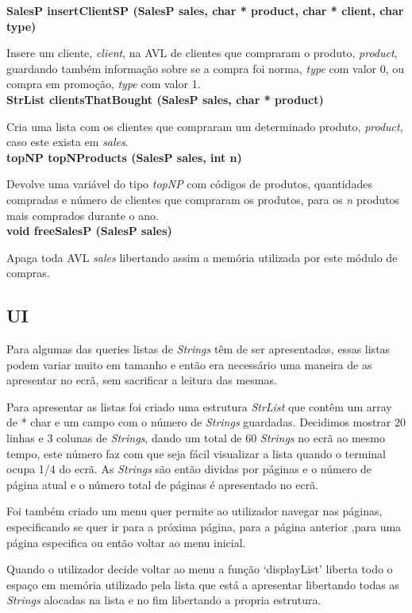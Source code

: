 \documentclass[12pt] {article}
\begin{document}
\noindent \textbf {SalesP insertClientSP (SalesP sales, char * product, char * client, char type)}
\par Insere um cliente, \emph{client}, na AVL de clientes que compraram o produto, \emph{product}, guardando 
também informação sobre se a compra foi norma, \emph{type} com valor 0, ou compra em promoção, 
\emph{type} com valor 1.\\

\noindent \textbf {StrList clientsThatBought (SalesP sales, char * product)}
\par Cria uma lista com os clientes que compraram um determinado produto, \emph{product}, caso este exista em
 \emph{sales}.\\
 
\noindent \textbf {topNP topNProducts (SalesP sales, int n)}
\par Devolve uma variável do tipo \emph{topNP} com códigos de produtos, quantidades compradas e número de 
clientes que compraram os produtos, para os \emph{n} produtos mais comprados durante o ano.\\

\noindent \textbf {void freeSalesP (SalesP sales)}
\par Apaga toda AVL \emph{sales} libertando assim a memória utilizada por este módulo de compras.\\

\subsection{UI}
\indent\par Para algumas das queries listas de \emph{Strings} têm de ser apresentadas, essas listas podem variar 
muito  em tamanho e então era necessário uma maneira de as apresentar no ecrã, sem sacrificar a leitura das 
mesmas. 
\par Para apresentar as listas foi criado uma estrutura \emph{StrList} que contêm um array de {* char} e um campo 
com o número de \emph{Strings} guardadas. Decidimos mostrar 20 linhas e 3 colunas de \emph{Strings}, 
dando um total de 60 \emph{Strings} no ecrã ao mesmo tempo, este número faz com que seja fácil visualizar a lista 
quando o terminal ocupa 1/4 do ecrã. As \emph{Strings} são então dividas por páginas e o número de página 
atual e o número total de páginas é apresentado no ecrã.
\par Foi também criado um menu quer permite ao utilizador navegar nas páginas, especificando se quer ir para a 
próxima página, para a página anterior ,para uma página especifica ou então voltar ao menu inicial.
\par Quando o utilizador decide voltar ao menu a função `displayList' liberta todo o espaço em memória utilizado 
pela lista que está a apresentar libertando todas as \emph{Strings} alocadas na lista e no fim libertando a propria 
estrutura.
\end{document}
